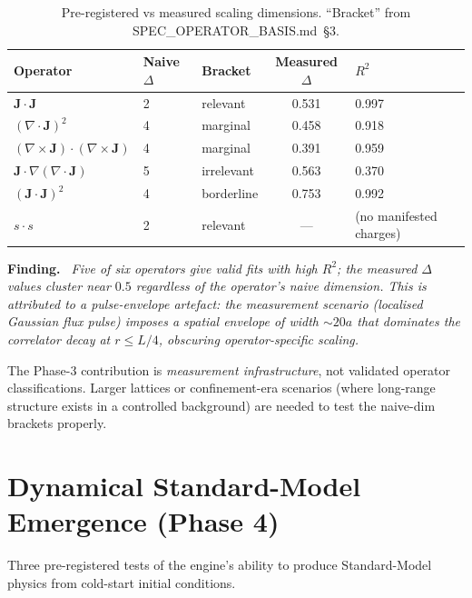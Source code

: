 \documentclass[11pt,letterpaper]{article}
\newenvironment{finding}{\par\medskip\noindent\textbf{Finding.}\itshape\ }{\par\medskip}
\begin{document}
\begin{table}[h]
\centering
\caption{Pre-registered vs measured scaling dimensions. ``Bracket''
from SPEC\_OPERATOR\_BASIS.md~\S3.}
\label{tab:operator-spectrum}
\begin{tabular}{lllcl}
\toprule
Operator & Naive $\Delta$ & Bracket & Measured $\Delta$ & $R^2$ \\
\midrule
$\mathbf{J} \cdot \mathbf{J}$                       & 2 & relevant    & 0.531 & 0.997 \\
$(\nabla \cdot \mathbf{J})^2$                        & 4 & marginal    & 0.458 & 0.918 \\
$(\nabla \times \mathbf{J}) \cdot (\nabla \times \mathbf{J})$ & 4 & marginal    & 0.391 & 0.959 \\
$\mathbf{J} \cdot \nabla(\nabla \cdot \mathbf{J})$   & 5 & irrelevant  & 0.563 & 0.370 \\
$(\mathbf{J} \cdot \mathbf{J})^2$                    & 4 & borderline  & 0.753 & 0.992 \\
$s \cdot s$                                          & 2 & relevant    & --- & (no manifested charges) \\
\bottomrule
\end{tabular}
\end{table}

\begin{finding}
Five of six operators give valid fits with high $R^2$; the measured
$\Delta$ values cluster near $0.5$ regardless of the operator's naive
dimension. This is attributed to a pulse-envelope artefact: the
measurement scenario (localised Gaussian flux pulse) imposes a
spatial envelope of width $\sim 20a$ that dominates the correlator
decay at $r \leq L/4$, obscuring operator-specific scaling.
\end{finding}

The Phase-3 contribution is \emph{measurement infrastructure}, not
validated operator classifications. Larger lattices or confinement-era
scenarios (where long-range structure exists in a controlled background)
are needed to test the naive-dim brackets properly.

\section{Dynamical Standard-Model Emergence (Phase 4)}
\label{sec:dynamical}

Three pre-registered tests of the engine's ability to produce
Standard-Model physics from cold-start initial conditions.
\end{document}
